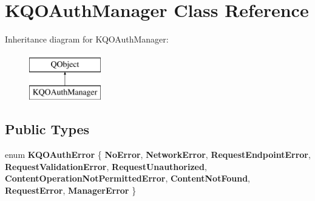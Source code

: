 \hypertarget{class_k_q_o_auth_manager}{}\section{K\+Q\+O\+Auth\+Manager Class Reference}
\label{class_k_q_o_auth_manager}
Inheritance diagram for K\+Q\+O\+Auth\+Manager\+:\begin{figure}[H]
\begin{center}
\leavevmode
\includegraphics[height=2.000000cm]{class_k_q_o_auth_manager}
\end{center}
\end{figure}
\subsection*{Public Types}
\begin{DoxyCompactItemize}
\item 
\mbox{\label{class_k_q_o_auth_manager_afdc8962f67eb38149455a14c0a5efb8c}} 
enum {\bfseries K\+Q\+O\+Auth\+Error} \{ \newline
{\bfseries No\+Error}, 
{\bfseries Network\+Error}, 
{\bfseries Request\+Endpoint\+Error}, 
{\bfseries Request\+Validation\+Error}, 
\newline
{\bfseries Request\+Unauthorized}, 
{\bfseries Content\+Operation\+Not\+Permitted\+Error}, 
{\bfseries Content\+Not\+Found}, 
{\bfseries Request\+Error}, 
\newline
{\bfseries Manager\+Error}
 \}
\end{DoxyCompactItemize}
